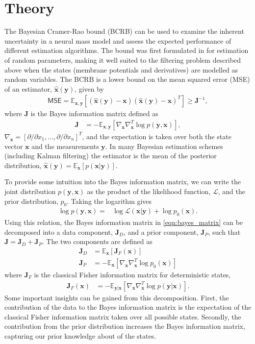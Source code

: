\documentclass{article}
\renewcommand{\vec}[1]{\ensuremath{{\boldsymbol #1}}}
\newcommand{\mat}[1]{\ensuremath{\boldsymbol{#1}}}
\begin{document}
\section{Theory}
The Bayesian Cramer-Rao bound (BCRB) can be used to examine the inherent uncertainty in a neural mass model and assess the expected performance of different estimation algorithms. The bound was first formulated in \cite{VanTrees1968} for estimation of random parameters, making it well suited to the filtering problem described above when the states (membrane potentials and derivatives) are modelled as random variables. The BCRB is a lower bound on the mean squared error (MSE) of an estimator, $\hat{\vec x}(\vec y)$, given by
\begin{align}
	\mathsf{MSE} = \mathbb E_{\vec x,\vec y} [(\hat{\vec x}(\vec y) - \vec x)(\hat{\vec x}(\vec y) - \vec x)^T] \ge \mat J^{-1},
	\label{eqn:mse_bound}
\end{align}
where $\mat J$ is the Bayes information matrix defined as
\begin{align}
	\mat J &= -\mathbb E_{\vec x,\vec y}\left[ \nabla_{\vec x}\nabla_{\vec x}^T \log p(\vec y,\vec x) \right],
	\label{eqn:bayes_matrix}
\end{align}
$\nabla_{\vec x} = [\partial/\partial x_1,\ldots,\partial/\partial x_n]^T$, and the expectation is taken over both the state vector $\vec x$ and the measurements $\vec y$. In many Bayesian estimation schemes (including Kalman filtering) the estimator is the mean of the posterior distribution, $\hat{\vec x}(\vec y) = \mathbb{E}_{\vec x}\left[ p (\vec x|\vec y)\right]$. 

To provide some intuition into the Bayes information matrix, we can write the joint distribution $p(\vec y,\vec x)$ as the product of the likelihood function, $\mathcal L$, and the prior distribution, $p_0$. Taking the logarithm gives
\begin{align}
	\log p(\vec y,\vec x) =& \log\mathcal{L}(\vec x|\vec y) + \log p_0(\vec x).
\end{align}
Using this relation, the Bayes information matrix in \eqref{eqn:bayes_matrix} can be decomposed into a data component, $\mat J_D$, and a prior component, $\mat J_P$, such that $\mat J = \mat J_D + \mat J_P$.
The two components are defined as
\begin{align}
	\mat J_D &= \mathbb E_{\vec x}\left[ \mat J_F(\vec x) \right]  \\
	\mat J_P &= -\mathbb E_{\vec x}\left[ \nabla_{\vec x}\nabla_{\vec x}^T \log p_0(\vec x) \right]
\end{align}
where $\mat J_F$ is the classical Fisher information matrix for deterministic states,
\begin{align}
	\mat J_F(\vec x) &= -\mathbb E_{\vec y| \vec x}\left[ \nabla_{\vec x}\nabla_{\vec x}^T \log p(\vec y|\vec x) \right].
\end{align}
Some important insights can be gained from this decomposition. First, the contribution of the data to the Bayes information matrix is the expectation of the classical Fisher information matrix taken over all possible states. Secondly, the contribution from the prior distribution increases the Bayes information matrix, capturing our prior knowledge about of the states.
\end{document}
